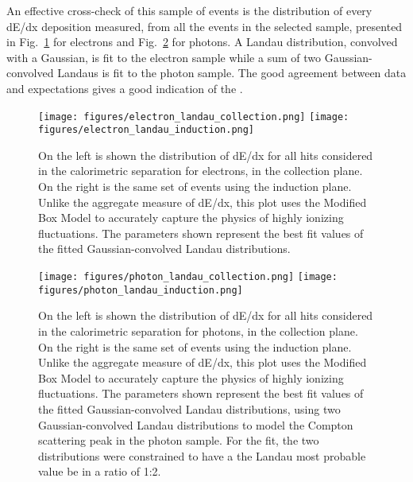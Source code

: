 An effective cross-check of this sample of events is the distribution of every dE/dx deposition 
measured, from all the events in the selected sample, presented in 
Fig.~\ref{fig:electron_landau} for electrons and Fig.~\ref{fig:photon_landau} 
for photons.  A Landau distribution, convolved with a Gaussian, is fit to the 
electron sample while a sum of two Gaussian-convolved Landaus is fit to the 
photon sample.  The good agreement between data and expectations gives a good indication of the .


\begin{figure}[tb]
   \centering
   
\texttt{[image: figures/electron\_landau\_collection.png]}
   \texttt{[image: figures/electron\_landau\_induction.png]}
   \caption{On the left is shown the distribution of dE/dx for all hits 
considered in the calorimetric separation for electrons, in the collection 
plane.  On the right is the same set of events using the induction plane.  
Unlike the aggregate measure of dE/dx, this plot uses the Modified Box Model to 
accurately capture the physics of highly ionizing fluctuations.  The parameters 
shown represent the best fit values of the fitted Gaussian-convolved Landau 
distributions.}
   \label{fig:electron_landau}
 \end{figure} 


\begin{figure}[tb]
   \centering
   \texttt{[image: figures/photon\_landau\_collection.png]}
   \texttt{[image: figures/photon\_landau\_induction.png]}
   \caption{On the left is shown the distribution of dE/dx for all hits 
considered in the calorimetric separation for photons, in the collection plane.  
On the right is the same set of events using the induction plane.  Unlike the 
aggregate measure of dE/dx, this plot uses the Modified Box Model to accurately 
capture the physics of highly ionizing fluctuations.  The parameters shown 
represent the best fit values of the fitted Gaussian-convolved Landau 
distributions, using two Gaussian-convolved Landau distributions to model the 
Compton scattering peak in the photon sample.  For the fit, the two 
distributions were constrained to have a the Landau most probable value be in a 
ratio of 1:2.}
   \label{fig:photon_landau}
 \end{figure} 





